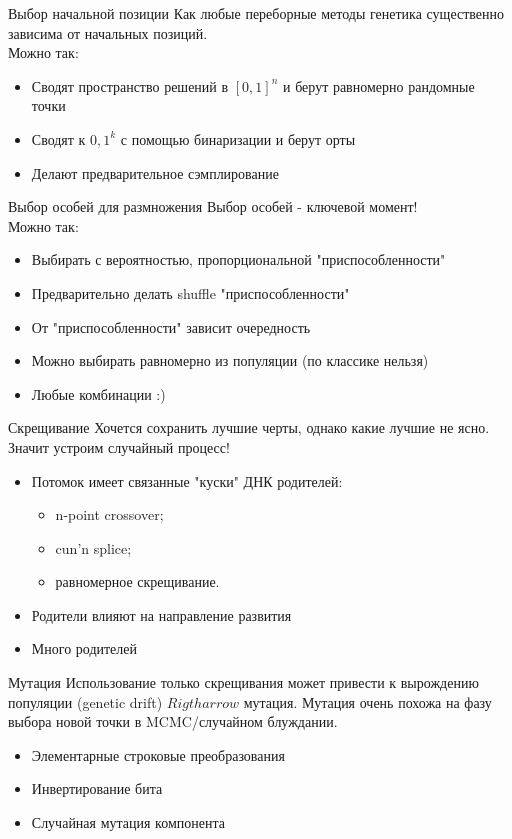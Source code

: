 \documentclass[14pt, fleqn, xcolor={dvipsnames, table}]{beamer}
\begin{document}
\begin{frame}{Выбор начальной позиции}
Как любые переборные методы генетика существенно зависима от начальных позиций. \\
Можно так:
\begin{itemize}
  \item Сводят пространство решений в $[0,1]^n$ и берут равномерно рандомные точки
  \item Сводят к ${0,1}^k$ с помощью бинаризации и берут орты
  \item Делают предварительное сэмплирование
\end{itemize}
\end{frame}

\begin{frame}{Выбор особей для размножения}
Выбор особей - ключевой момент! \\
Можно так:
\begin{itemize}
  \item Выбирать с вероятностью, пропорциональной "приспособленности"
  \item Предварительно делать shuffle "приспособленности"
  \item От "приспособленности" зависит очередность
  \item Можно выбирать равномерно из популяции (по классике нельзя)
  \item Любые комбинации :)
\end{itemize}
\end{frame}

\begin{frame}{Скрещивание}
Хочется сохранить лучшие черты, однако какие лучшие не ясно. Значит устроим случайный процесс!
\begin{itemize}
  \item Потомок имеет связанные "куски" ДНК родителей:
  \begin{itemize}
    \item n-point crossover;
    \item cun'n splice;
    \item равномерное скрещивание.
  \end{itemize}
  \item Родители влияют на направление развития
  \item Много родителей
\end{itemize}
\end{frame}

\begin{frame}{Мутация}
Использование только скрещивания может привести к вырождению популяции (genetic drift) $Rigtharrow$ мутация.
Мутация очень похожа на фазу выбора новой точки в MCMC/случайном блуждании.
\begin{itemize}
  \item Элементарные строковые преобразования
  \item Инвертирование бита
  \item Случайная мутация компонента
\end{itemize}
\end{frame}
\end{document}
